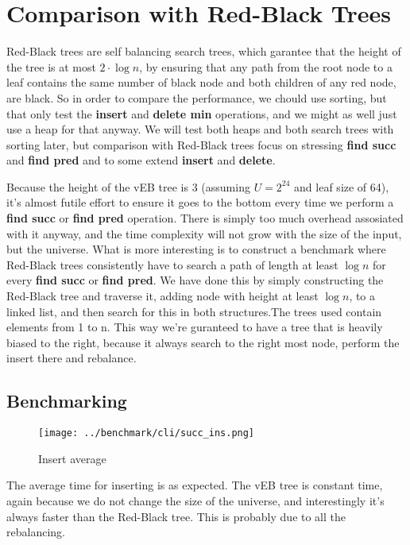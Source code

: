 \section*{Comparison with Red-Black Trees}
Red-Black trees are self balancing search trees, which garantee that the height of the tree is at most $2 \cdot \log n$, by ensuring that any path from the root node to a leaf contains the same number of black node and both children of any red node, are black. So in order to compare the performance, we chould use sorting, but that only test the \textbf{insert} and \textbf{delete min} operations, and we might as well just use a heap for that anyway. We will test both heaps and both search trees with sorting later, but comparison with Red-Black trees focus on stressing \textbf{find succ} and \textbf{find pred} and to some extend \textbf{insert} and \textbf{delete}.

Because the height of the vEB tree is $3$ (assuming $U = 2^{24}$ and leaf size of 64), it's almost futile effort to ensure it goes to the bottom every time we perform a \textbf{find succ} or \textbf{find pred} operation. There is simply too much overhead assosiated with it anyway, and the time complexity will not grow with the size of the input, but the universe. What is more interesting is to construct a benchmark where Red-Black trees consistently have to search a path of length at least $\log n$ for every \textbf{find succ} or \textbf{find pred}. We have done this by simply constructing the Red-Black tree and traverse it, adding node with height at least $\log n$, to a linked list, and then search for this in both structures.The trees used contain elements from 1 to n. This way we're guranteed to have a tree that is heavily biased to the right, because it always search to the right most node, perform the insert there and rebalance.

\subsection*{Benchmarking}

\begin{figure}[htb]
\centering
\texttt{[image: ../benchmark/cli/succ\_ins.png]}
\caption{Insert average}
\label{fig:succ-ins}
\end{figure}

The average time for inserting is as expected. The vEB tree is constant time, again because we do not change the size of the universe, and interestingly it's always faster than the Red-Black tree. This is probably due to all the rebalancing.

